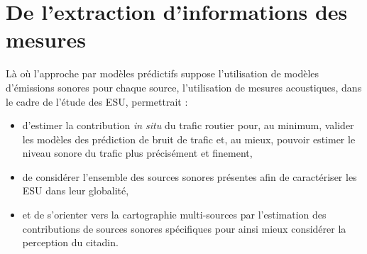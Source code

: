 

\section{De l'extraction d'informations des mesures}

Là où l'approche par modèles prédictifs suppose l'utilisation de modèles d'émissions sonores pour chaque source, l'utilisation de mesures acoustiques, dans le cadre de l'étude des ESU, permettrait :

\begin{itemize}
\item d'estimer la contribution \textit{in situ} du trafic routier pour, au minimum, valider les modèles des prédiction de bruit de trafic et, au mieux, pouvoir estimer le niveau sonore du trafic plus précisément et finement,
\item de considérer l'ensemble des sources sonores présentes afin de caractériser les ESU dans leur globalité,
\item et de s'orienter vers la cartographie multi-sources par l'estimation des contributions de sources sonores spécifiques pour ainsi mieux considérer la perception du citadin.\\
\end{itemize}

